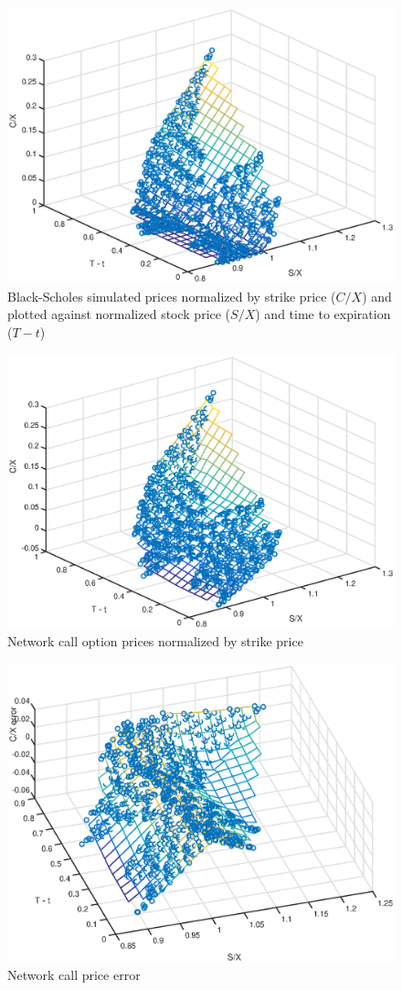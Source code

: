 \documentclass[12pt]{article}
\begin{document}
  \begin{figure}
    \centering
    \includegraphics[width=0.75\linewidth]{figures/1.eps}
    \caption{Black-Scholes simulated prices normalized by strike price ($C/X$) and plotted against normalized stock price ($S/X$) and time to expiration ($T - t$)}
    \label{fig:blsprices}
  \end{figure}
  \begin{figure}
    \centering
    \includegraphics[width=0.75\linewidth]{figures/2.eps}
    \caption{Network call option prices normalized by strike price}
    \label{fig:rdfprices}
  \end{figure}
  \begin{figure}
    \centering
    \includegraphics[width=0.75\linewidth]{figures/3.eps}
    \caption{Network call price error}
    \label{fig:rdferror}
  \end{figure}
\end{document}
